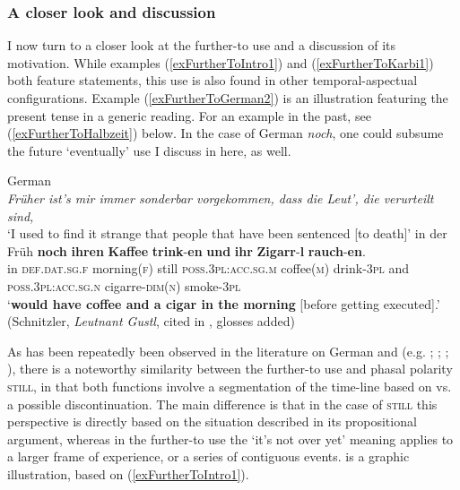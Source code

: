 {\subsubsection{A closer look and discussion} I now turn to a closer look at the further-to use and a discussion of its motivation. While examples (\ref{exFurtherToIntro1}) and (\ref{exFurtherToKarbi1}) both feature  statements, this use is also found in other temporal-aspectual configurations. Example (\ref{exFurtherToGerman2}) is an illustration featuring the present tense in a generic reading. For an example in the past, see (\ref{exFurtherToHalbzeit}) below. In the case of German \textit{noch}, one could subsume the future \lq eventually\rq{ }use I discuss in  here, as well.

\begin{exe}
	\ex German\label{exFurtherToGerman2}\\
	\textit{Früher ist's mir immer sonderbar vorgekommen, dass die Leut', die verurteilt sind,}
	\\\lq I used to find it strange that people that have been sentenced [to death]\rq
	\exi{}\gll  in der Früh \textbf{noch} \textbf{ihren} \textbf{Kaffee}  \textbf{trink}-\textbf{en} \textbf{und} \textbf{ihr} \textbf{Zigarr}-\textbf{l} \textbf{rauch}-\textbf{en}.\\		
	in \textsc{def}.\textsc{dat}.\textsc{sg}.\textsc{f} morning(\textsc{f}) still \textsc{poss}.3\textsc{pl}:\textsc{acc}.\textsc{sg}.\textsc{m} coffee(\textsc{m}) drink-3\textsc{pl} and \textsc{poss}.3\textsc{pl}:\textsc{acc}.\textsc{sg}.\textsc{n} cigarre-\textsc{dim}(\textsc{n}) smoke-3\textsc{pl}\\
\glt \lq \textbf{would have coffee and a cigar in the morning} [before getting executed].' (Schnitzler, \textit{Leutnant Gustl}, cited in \cite[58]{Shetter1966}, glosses added)
\end{exe}

As has been repeatedly been observed in the literature on German and  (e.g. \cite{Klein2018}; \cite{Nederstigt2003}; \cite{Shetter1966}; \cite{Vandeweghe1984}), there is a noteworthy similarity between the further-to use and phasal polarity \textsc{still}, in that both functions involve a segmentation of the time-line based on  vs. a possible discontinuation. The main difference is that in the case of \textsc{still} this perspective is directly based on the situation described in its propositional argument, whereas in the further-to use the \lq it's not over yet\rq{ }meaning applies to a larger frame of experience, or a series of contiguous events.  is a graphic illustration, based on (\ref{exFurtherToIntro1}).

}
